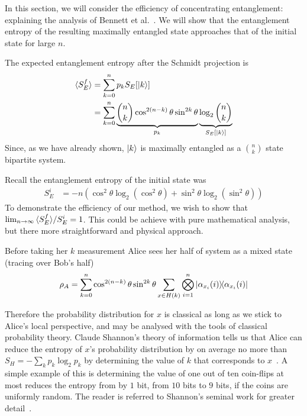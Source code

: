 In this section, we will consider the efficiency of concentrating entanglement: explaining the analysis of Bennett et al.~\cite{bennett1996concentrating}.
We will show that the entanglement entropy of the resulting maximally entangled state approaches that of the initial state for large $n$.

The expected entanglement entropy after the Schmidt projection is
\begin{align*}
{\langle S_E^f \rangle} &= \sum_{k=0}^n p_k S_E[\ket{k}] \\
&=\sum_{k=0}^n \underbrace{\binom{n}{k} \cos^{2(n-k)}\theta \sin^{2k}\theta}_{p_k}
 \underbrace{\log_2 \binom{n}{k}}_{S_E[\ket{k}]}
\end{align*}
Since, as we have already shown, $\ket{k}$ is maximally entangled as a $\binom{n}{k}$ state bipartite system.

Recall the entanglement entropy of the initial state was
\begin{align*}
S_{E}^i &= -n \left( \cos^2\theta \log_2 \left(\cos^2\theta \right)
+ \sin^2\theta \log_2 \left(\sin^2\theta \right)\right)
\end{align*}
To demonstrate the efficiency of our method, we wish to show that \\$\lim_{n \rightarrow \infty}  {\langle S_E^f \rangle} / S_E^i  = 1$.
This could be achieve with pure mathematical analysis, but there more straightforward and physical approach.

Before taking her $k$ measurement Alice sees her half of system as a mixed state (tracing over Bob's half)
\begin{align*}
\rho_A = \sum_{k=0}^n \cos^{2(n-k)}\theta \sin^{2k}\theta
\sum_{x \in H(k)} \bigotimes_{i=1}^n 
\dyad{\alpha_{x_i}(i)}{\alpha_{x_i}(i)}
\end{align*}

Therefore the probability distribution for $x$ is classical as long as we stick to Alice's local perspective, and may be analysed with the tools of classical probability theory.
Claude Shannon's theory of information tells us that Alice can reduce the entropy of $x$'s probability distribution  by on average no more than $S_H = - \sum_k p_k \log_2 p_k$ by determining the value of $k$ that corresponds to $x$~\cite{shannon2001communication}. A simple example of this is determining the value of one out of ten coin-flips at most reduces the entropy from by $1$ bit, from $10$ bits to $9$ bits, if the coins are uniformly random. The reader is referred to Shannon's seminal work for greater detail~\cite{shannon2001communication}.

